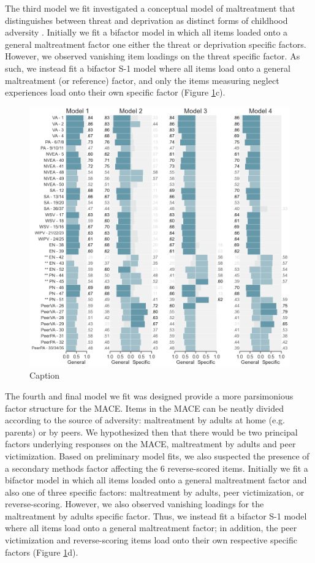 \documentclass[letterpaper,man,natbib,floatsintext,longtable]{apa6}
\begin{document}
The third model we fit investigated a conceptual model of maltreatment that distinguishes between threat and deprivation as distinct forms of childhood adversity \citep{mclaughlin2014childhood}. Initially we fit a bifactor model in which all items loaded onto a general maltreatment factor one either the threat or deprivation specific factors. However, we observed vanishing item loadings on the threat specific factor. As such, we instead fit a bifactor S-1 model \citep{eid2017anomalous} where all items load onto a general maltreatment (or reference) factor, and only the items measuring neglect experiences load onto their own specific factor (Figure \ref{fig:models}c). 

\begin{figure}[t!]
    \centering
    \includegraphics[width=1.1\textwidth,center]{figures/fig01.png}
    \caption{Caption}
    \label{fig:models}
\end{figure}

The fourth and final model we fit was designed provide a more parsimonious factor structure for the MACE. Items in the MACE can be neatly divided according to the source of adversity: maltreatment by adults at home (e.g. parents) or by peers. We hypothesized then that there would be two principal factors underlying responses on the MACE, maltreatment by adults and peer victimization. Based on preliminary model fits, we also suspected the presence of a secondary methods factor affecting the 6 reverse-scored items. Initially we fit a bifactor model in which all items loaded onto a general maltreatment factor and also one of three specific factors: maltreatment by adults, peer victimization, or reverse-scoring. However, we also observed vanishing loadings for the maltreatment by adults specific factor. Thus, we instead fit a bifactor S-1 model where all items load onto a general maltreatment factor; in addition, the peer victimization and reverse-scoring items load onto their own respective specific factors (Figure \ref{fig:models}d). 
\end{document}
